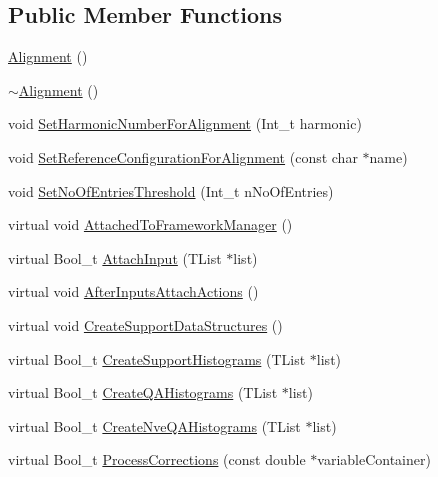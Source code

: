 \subsection*{Public Member Functions}
\begin{DoxyCompactItemize}
\item 
\mbox{\hyperlink{classQn_1_1Alignment_aeeec4b4eac91478f48d89e453cb3e10a}{Alignment}} ()
\item 
\mbox{\hyperlink{classQn_1_1Alignment_ad364189f6410b258123d7bd9d8bf0373}{$\sim$\+Alignment}} ()
\item 
void \mbox{\hyperlink{classQn_1_1Alignment_ae8e25ee857f8773757ba3936a8da9b70}{Set\+Harmonic\+Number\+For\+Alignment}} (Int\+\_\+t harmonic)
\item 
void \mbox{\hyperlink{classQn_1_1Alignment_a03d25738c83b68757e23eabc563d60c6}{Set\+Reference\+Configuration\+For\+Alignment}} (const char $\ast$name)
\item 
void \mbox{\hyperlink{classQn_1_1Alignment_a70d38db6adb97c47746d00f28f2b605c}{Set\+No\+Of\+Entries\+Threshold}} (Int\+\_\+t n\+No\+Of\+Entries)
\item 
virtual void \mbox{\hyperlink{classQn_1_1Alignment_ad9791cc06c9a7d8c407e1f783c7625f8}{Attached\+To\+Framework\+Manager}} ()
\item 
virtual Bool\+\_\+t \mbox{\hyperlink{classQn_1_1Alignment_a3ae85e6706fe2a04098d339fcfff9113}{Attach\+Input}} (T\+List $\ast$list)
\item 
virtual void \mbox{\hyperlink{classQn_1_1Alignment_a38007827bb028b2f2e0b4a3fb988d8ed}{After\+Inputs\+Attach\+Actions}} ()
\item 
virtual void \mbox{\hyperlink{classQn_1_1Alignment_afb0137bb2443eb44448bf15734096765}{Create\+Support\+Data\+Structures}} ()
\item 
virtual Bool\+\_\+t \mbox{\hyperlink{classQn_1_1Alignment_ada53d00555fc8a59644b3db5a8584de3}{Create\+Support\+Histograms}} (T\+List $\ast$list)
\item 
virtual Bool\+\_\+t \mbox{\hyperlink{classQn_1_1Alignment_a1b2499a48a748c4064804e0a5a283272}{Create\+Q\+A\+Histograms}} (T\+List $\ast$list)
\item 
virtual Bool\+\_\+t \mbox{\hyperlink{classQn_1_1Alignment_ac11ae0ae7f1ea1e1b8408d73469d54d1}{Create\+Nve\+Q\+A\+Histograms}} (T\+List $\ast$list)
\item 
virtual Bool\+\_\+t \mbox{\hyperlink{classQn_1_1Alignment_a57b815d9ce4d0ae4f94ff6cb46eb2514}{Process\+Corrections}} (const double $\ast$variable\+Container)
\item 

\end{DoxyCompactItemize}
